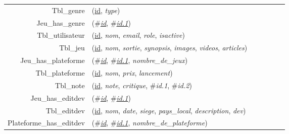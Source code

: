 
\usepackage[normalem]{ulem}
\newenvironment{mld}
  {\par\begin{minipage}{\linewidth}\begin{tabular}{rp{0.7\linewidth}}}
  {\end{tabular}\end{minipage}\par}
\newcommand{\relat}[1]{\textsc{#1}}
\newcommand{\attr}[1]{\emph{#1}}
\newcommand{\prim}[1]{\uline{#1}}
\newcommand{\foreign}[1]{\#\textsl{#1}}


\begin{mld}
  Tbl\_genre & (\prim{id}, \attr{type})\\
  Jeu\_has\_genre & (\foreign{\prim{id}}, \foreign{\prim{id.1}})\\
  Tbl\_utilisateur & (\prim{id}, \attr{nom}, \attr{email}, \attr{role}, \attr{isactive})\\
  Tbl\_jeu & (\prim{id}, \attr{nom}, \attr{sortie}, \attr{synopsis}, \attr{images}, \attr{videos}, \attr{articles})\\
  Jeu\_has\_plateforme & (\foreign{\prim{id}}, \foreign{\prim{id.1}}, \attr{nombre\_de\_jeux})\\
  Tbl\_plateforme & (\prim{id}, \attr{nom}, \attr{prix}, \attr{lancement})\\
  Tbl\_note & (\prim{id}, \attr{note}, \attr{critique}, \foreign{id.1}, \foreign{id.2})\\
  Jeu\_has\_editdev & (\foreign{\prim{id}}, \foreign{\prim{id.1}})\\
  Tbl\_editdev & (\prim{id}, \attr{nom}, \attr{date}, \attr{siege}, \attr{pays\_local}, \attr{description}, \attr{dev})\\
  Plateforme\_has\_editdev & (\foreign{\prim{id}}, \foreign{\prim{id.1}}, \attr{nombre\_de\_plateforme})\\
\end{mld}